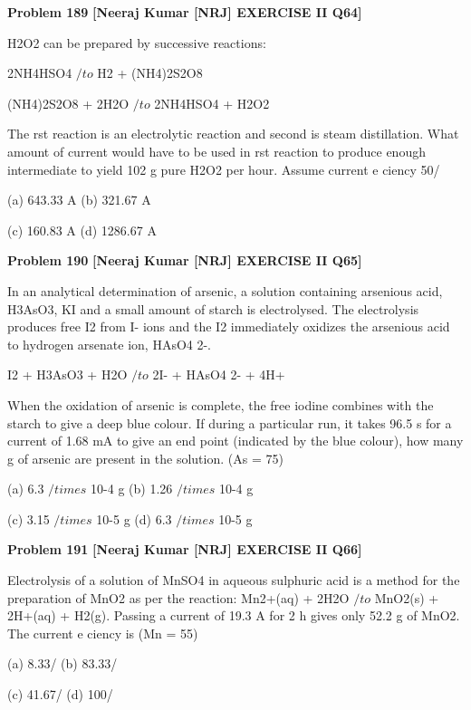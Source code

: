 \begin{problembox}
\textbf{Problem 189} \hfill \textbf{[Neeraj Kumar [NRJ] EXERCISE II Q64]}
\label{q:ext-nrj_all_questions-189}

H2O2 can be prepared by successive reactions:
 
  2NH4HSO4 $/to$ H2 + (NH4)2S2O8
 
   (NH4)2S2O8 + 2H2O $/to$ 2NH4HSO4 + H2O2
 
 The   rst reaction is an electrolytic reaction and 
second is steam distillation. What amount of 
current would have to be used in   rst reaction to 
produce enough intermediate to yield 102 g pure 
H2O2 per hour. Assume current e   ciency 50/%
 
 (a) 643.33 A 
(b) 321.67 A
 
 (c) 160.83 A 
(d) 1286.67 A
\end{problembox}

\begin{problembox}
\textbf{Problem 190} \hfill \textbf{[Neeraj Kumar [NRJ] EXERCISE II Q65]}
\label{q:ext-nrj_all_questions-190}

In an analytical determination of arsenic, a 
solution containing arsenious acid, H3AsO3, KI 
and a small amount of starch is electrolysed. 
The electrolysis produces free I2 from I- ions and 
the I2 immediately oxidizes the arsenious acid to 
hydrogen arsenate ion, HAsO4
2-.
 
   I2 + H3AsO3 + H2O $/to$ 2I- + HAsO4
2- + 4H+
 
 When the oxidation of arsenic is complete, the 
free iodine combines with the starch to give a deep 
blue colour. If during a particular run, it takes 
96.5 s for a current of 1.68 mA to give an end 
point (indicated by the blue colour), how many g 
of arsenic are present in the solution. (As = 75)
 
 (a) 6.3 $/times$ 10-4 g 
(b) 1.26 $/times$ 10-4 g
 
 (c) 3.15 $/times$ 10-5 g 
(d) 6.3 $/times$ 10-5 g
\end{problembox}

\begin{problembox}
\textbf{Problem 191} \hfill \textbf{[Neeraj Kumar [NRJ] EXERCISE II Q66]}
\label{q:ext-nrj_all_questions-191}

Electrolysis of a solution of MnSO4 in aqueous 
sulphuric acid is a method for the preparation 
of MnO2 as per the reaction: Mn2+(aq) + 2H2O 
$/to$ MnO2(s) + 2H+(aq) + H2(g). Passing a current 
of 19.3 A for 2 h gives only 52.2 g of MnO2. The 
current e   ciency is (Mn = 55)
 
 (a) 8.33/%
(b) 83.33/%
 
 (c) 41.67/%
(d) 100/%
\end{problembox}

